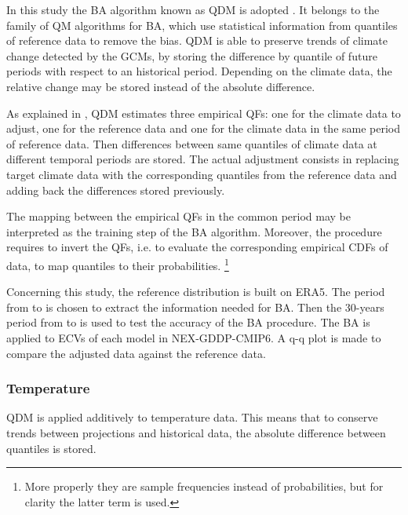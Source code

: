 In this study the \gls{BA} algorithm known as \gls{QDM} is adopted \cite{2015CannonBiasCorrection}. It belongs to the family of \gls{QM} algorithms for \gls{BA}, which use statistical information from quantiles of reference data to remove the bias. \Gls{QDM} is able to preserve trends of climate change detected by the \glspl{GCM}, by storing the difference by quantile of future periods with respect to an historical period. Depending on the climate data, the relative change may be stored instead of the absolute difference.

As explained in \cite[6941-6942]{2015CannonBiasCorrection}, \gls{QDM} estimates three empirical \glspl{QF}: one for the climate data to adjust, one for the reference data and one for the climate data in the same period of reference data. Then differences between same quantiles of climate data at different temporal periods are stored. The actual adjustment consists in replacing target climate data with the corresponding quantiles from the reference data and adding back the differences stored previously.

The mapping between the empirical \glspl{QF} in the common period may be interpreted as the training step of the \gls{BA} algorithm. Moreover, the procedure requires to invert the \glspl{QF}, i.e. to evaluate the corresponding empirical \glspl{CDF} of data, to map quantiles to their probabilities.%
\footnote{More properly they are sample frequencies instead of probabilities, but for clarity the latter term is used.}

Concerning this study, the reference distribution is built on ERA5. The period from  to  is chosen to extract the information needed for \gls{BA}. Then the 30-years period from  to  is used to test the accuracy of the \gls{BA} procedure.
The \gls{BA} is applied to \glspl{ECV} of each model in NEX-GDDP-CMIP6. A q-q plot is made to compare the adjusted data against the reference data.



\subsubsection{Temperature}
\Gls{QDM} is applied additively to temperature data. This means that to conserve trends between projections and historical data, the absolute difference between quantiles is stored.

